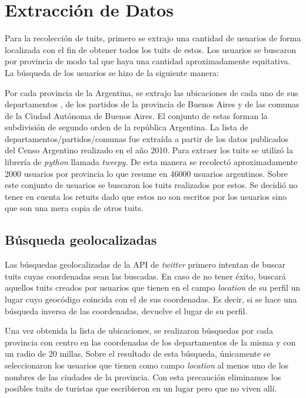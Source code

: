 

\section{Extracción de Datos}

Para la recolección de tuits, primero se extrajo una cantidad de usuarios de forma localizada con el fin de obtener todos los tuits de estos.
Los usuarios se buscaron por provincia de modo tal que haya una cantidad aproximadamente equitativa.
La búsqueda de los usuarios se hizo de la siguiente manera:

Por cada provincia de la Argentina, se extrajo las ubicaciones de cada uno de sus departamentos , de los partidos de la provincia de Buenos Aires y de las comunas de la Ciudad Autónoma de Buenos Aires. El conjunto de estas forman la subdivisión de segundo orden de la república Argentina. La lista de departamentos/partidos/comunas fue extraída a partir de los datos publicados del Censo Argentino realizado en el año 2010. Para extraer los tuits se utilizó la librería de \textit{python} llamada \textit{tweepy}.
De esta manera se recolectó aproximadamente 2000 usuarios por provincia lo que resume en 46000 usuarios argentinos. Sobre este conjunto de usuarios se buscaron los tuits realizados por estos. Se decidió no tener en cuenta los retuits dado que estos no son escritos por los usuarios sino que son una mera copia de otros tuits. 


\subsection{Búsqueda geolocalizadas}

Las búsquedas geolocalizadas de la API de \textit{twitter} primero intentan de buscar tuits cuyas coordenadas sean las buscadas. En caso de no tener éxito, buscará aquellos tuits creados por usuarios que tienen en el campo \textit{location} de su perfil un lugar cuyo geocódigo coincida con el de sus coordenadas. Es decir, si se hace una búsqueda inversa de las coordenadas, devuelve el lugar de su perfil.

Una vez obtenida la lista de ubicaciones, se realizaron búsquedas por cada provincia con centro en las coordenadas de los departamentos de la misma y con un radio de 20 millas. Sobre el resultado de esta búsqueda, únicamente se seleccionaron los usuarios que tienen como campo \textit{location} al menos uno de los nombres de las ciudades de la provincia. Con esta precaución eliminamos los posibles tuits de turistas que escribieron en un lugar pero que no viven allí.

